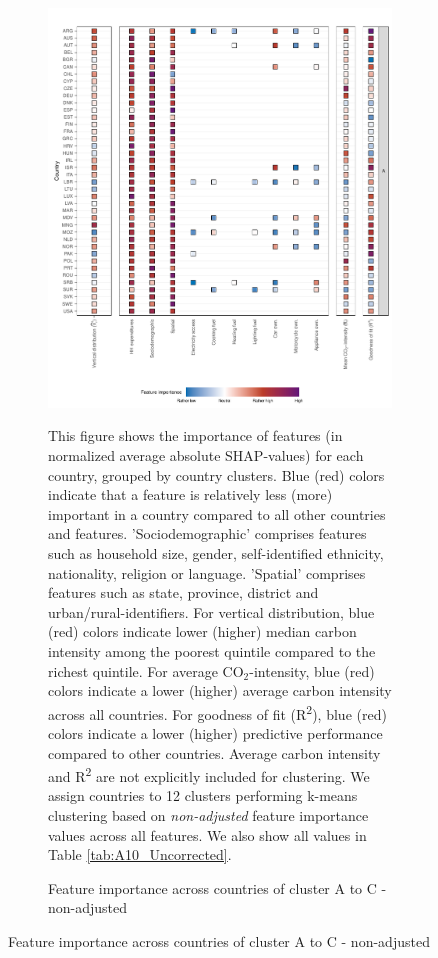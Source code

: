 \clearpage
\begin{figure}[ht!]
    \centering
    \caption{Feature importance across countries by cluster - Alternative clustering}\label{fig:fig_4_uncorrected}
    \begin{subfigure}[b]{\textwidth}
    \centering
    \includegraphics{1_Figures/Figure 4/Figure_4_Uncorrected_1.pdf}
    \caption{Feature importance across countries of cluster A to C - non-adjusted}\label{fig:fig_4_1_uncorrected}
     \begin{subcaption2}
    This figure shows the importance of features (in normalized average absolute SHAP-values) for each country, grouped by country clusters. Blue (red) colors indicate that a feature is relatively less (more) important in a country compared to all other countries and features. 'Sociodemographic' comprises features such as household size, gender, self-identified ethnicity, nationality, religion or language. 'Spatial' comprises features such as state, province, district and urban/rural-identifiers. For vertical distribution, blue (red) colors indicate lower (higher) median carbon intensity among the poorest quintile compared to the richest quintile. For average CO$_{2}$-intensity, blue (red) colors indicate a lower (higher) average carbon intensity across all countries. For goodness of fit (R\textsuperscript{2}), blue (red) colors indicate a lower (higher) predictive performance compared to other countries. Average carbon intensity and R\textsuperscript{2} are not explicitly included for clustering.
    We assign countries to 12 clusters performing k-means clustering based on \textit{non-adjusted} feature importance values across all features. We also show all values in Table \ref{tab:A10_Uncorrected}.
    \end{subcaption2}
    \end{subfigure}
\end{figure}
\clearpage

